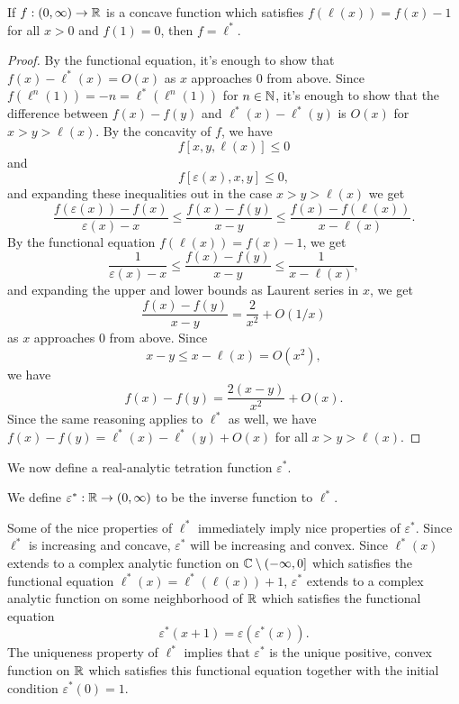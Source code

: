 \documentclass[letterpaper,11pt]{article}
\begin{document}
\begin{prop} If $f : (0,\infty) \rightarrow \mathbb{R}$ is a concave function which satisfies $f(\ell(x)) = f(x) - 1$ for all $x > 0$ and $f(1) = 0$, then $f = \ell^*$.
\end{prop}
\begin{proof} By the functional equation, it's enough to show that $f(x) - \ell^*(x) = O(x)$ as $x$ approaches $0$ from above. Since $f(\ell^n(1)) = -n = \ell^*(\ell^n(1))$ for $n \in \mathbb{N}$, it's enough to show that the difference between $f(x) - f(y)$ and $\ell^*(x) - \ell^*(y)$ is $O(x)$ for $x > y > \ell(x)$. By the concavity of $f$, we have
\[
f[x,y,\ell(x)] \le 0
\]
and
\[
f[\varepsilon(x),x,y] \le 0,
\]
and expanding these inequalities out in the case $x > y > \ell(x)$ we get
\[
\frac{f(\varepsilon(x)) - f(x)}{\varepsilon(x) - x} \le \frac{f(x) - f(y)}{x-y} \le \frac{f(x) - f(\ell(x))}{x - \ell(x)}.
\]
By the functional equation $f(\ell(x)) = f(x) - 1$, we get
\[
\frac{1}{\varepsilon(x) - x} \le \frac{f(x) - f(y)}{x-y} \le \frac{1}{x - \ell(x)},
\]
and expanding the upper and lower bounds as Laurent series in $x$, we get
\[
\frac{f(x) - f(y)}{x-y} = \frac{2}{x^2} + O(1/x)
\]
as $x$ approaches $0$ from above. Since
\[
x-y \le x - \ell(x) = O(x^2),
\]
we have
\[
f(x) - f(y) = \frac{2(x-y)}{x^2} + O(x).
\]
Since the same reasoning applies to $\ell^*$ as well, we have $f(x) - f(y) = \ell^*(x) - \ell^*(y) + O(x)$ for all $x > y > \ell(x)$.
\end{proof}

We now define a real-analytic tetration function $\varepsilon^*$.

\begin{defn} We define $\varepsilon^* : \mathbb{R} \rightarrow (0,\infty)$ to be the inverse function to $\ell^*$.
\end{defn}

Some of the nice properties of $\ell^*$ immediately imply nice properties of $\varepsilon^*$. Since $\ell^*$ is increasing and concave, $\varepsilon^*$ will be increasing and convex. Since $\ell^*(x)$ extends to a complex analytic function on $\mathbb{C}\setminus (-\infty,0]$ which satisfies the functional equation $\ell^*(x) = \ell^*(\ell(x)) + 1$, $\varepsilon^*$ extends to a complex analytic function on some neighborhood of $\mathbb{R}$ which satisfies the functional equation
\[
\varepsilon^*(x+1) = \varepsilon(\varepsilon^*(x)).
\]
The uniqueness property of $\ell^*$ implies that $\varepsilon^*$ is the unique positive, convex function on $\mathbb{R}$ which satisfies this functional equation together with the initial condition $\varepsilon^*(0) = 1$.
\end{document}
